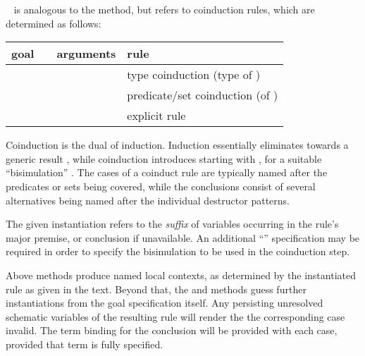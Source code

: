 \begin{isabellebody}
\begin{isamarkuptext}
\begin{description}
  \item \hyperlink{method.coinduct}{\mbox{}}~ is analogous to the
  \hyperlink{method.induct}{\mbox{}} method, but refers to coinduction rules, which are
  determined as follows:

  \medskip
  \begin{tabular}{llll}
    goal          &                    & arguments & rule \\\hline
                  & \hyperlink{method.coinduct}{\mbox{\isa{coinduct}}} & \isa{x} & type coinduction (type of \isa{x}) \\
    \isa{{\isachardoublequote}A\ x{\isachardoublequote}} & \hyperlink{method.coinduct}{\mbox{\isa{coinduct}}} & \isa{{\isachardoublequote}{\isasymdots}{\isachardoublequote}} & predicate/set coinduction (of \isa{A}) \\
    \isa{{\isachardoublequote}{\isasymdots}{\isachardoublequote}}   & \hyperlink{method.coinduct}{\mbox{\isa{coinduct}}} & \isa{{\isachardoublequote}{\isasymdots}\ rule{\isacharcolon}\ R{\isachardoublequote}} & explicit rule \isa{R} \\
  \end{tabular}
  
  Coinduction is the dual of induction.  Induction essentially
  eliminates  towards a generic result ,
  while coinduction introduces  starting with , for a suitable ``bisimulation'' .  The cases of a
  coinduct rule are typically named after the predicates or sets being
  covered, while the conclusions consist of several alternatives being
  named after the individual destructor patterns.
  
  The given instantiation refers to the \emph{suffix} of variables
  occurring in the rule's major premise, or conclusion if unavailable.
  An additional ``''
  specification may be required in order to specify the bisimulation
  to be used in the coinduction step.

  \end{description}

  Above methods produce named local contexts, as determined by the
  instantiated rule as given in the text.  Beyond that, the \hyperlink{method.induct}{\mbox{}} and \hyperlink{method.coinduct}{\mbox{}} methods guess further instantiations
  from the goal specification itself.  Any persisting unresolved
  schematic variables of the resulting rule will render the the
  corresponding case invalid.  The term binding \hyperlink{variable.?case}{\mbox{}} for
  the conclusion will be provided with each case, provided that term
  is fully specified.


\end{isamarkuptext}
\end{isabellebody}
